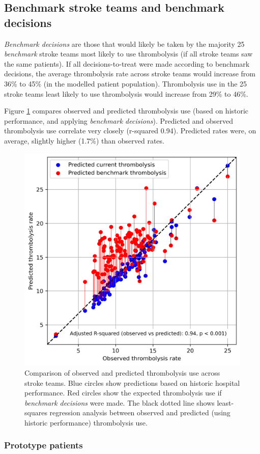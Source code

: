 \subsection{Benchmark stroke teams and benchmark decisions}

\textit{Benchmark decisions} are those that would likely be taken by the majority 25 \textit{benchmark} stroke teams most likely to use thrombolysis (if all stroke teams saw the same patients). If all decisions-to-treat were made according to benchmark decisions, the average thrombolysis rate across stroke teams would increase from 36\% to 45\% (in the modelled patient population). Thrombolysis use in the 25 stroke teams least likely to use thrombolysis would increase from 29\% to 46\%.

Figure \ref{fig:thrombolysis_rates_teams} compares observed and predicted thrombolysis use (based on historic performance, and applying \textit{benchmark decisions}). Predicted and observed thrombolysis use correlate very closely (r-squared 0.94). Predicted rates were, on average, slightly higher (1.7\%) than observed rates.

\begin{figure}
    \centering
    \includegraphics[width=0.5\linewidth]{images/p5_benchmark_rates.png}
    \caption{Comparison of observed and predicted thrombolysis use across stroke teams. Blue circles show predictions based on historic hospital performance. Red circles show the expected thrombolysis use if \textit{benchmark decisions} were made. The black dotted line shows least-squares regression analysis between observed and predicted (using historic performance) thrombolysis use.}
    \label{fig:thrombolysis_rates_teams}
\end{figure}

\subsubsection{Prototype patients}


